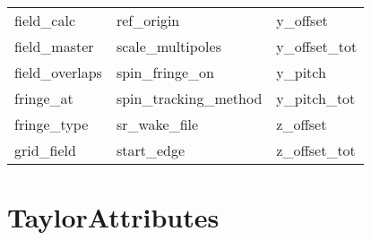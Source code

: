 \begin{tabular}{lll}
field_calc                  & ref_origin                  & y_offset                    \\
field_master                & scale_multipoles            & y_offset_tot                \\
field_overlaps              & spin_fringe_on              & y_pitch                     \\
fringe_at                   & spin_tracking_method        & y_pitch_tot                 \\
fringe_type                 & sr_wake_file                & z_offset                    \\
grid_field                  & start_edge                  & z_offset_tot                \\
 \bottomrule
 \end{tabular}
 \vfill
 
 \section{TaylorAttributes}
 \label{s:list.taylor}
 
